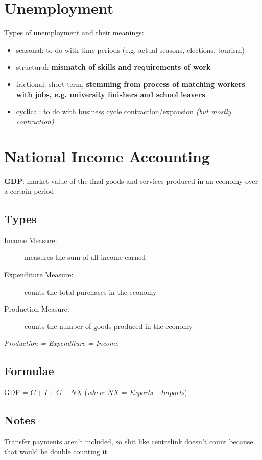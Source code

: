 \documentclass{article}
\begin{document}
\section{Unemployment}
\label{sec:unemp}

Types of unemployment and their meanings:
\begin{itemize}
\item seasonal: to do with time periods (e.g. actual seasons, elections, tourism) 
\item structural: \textbf{mismatch of skills and requirements of work}
\item frictional: short term, \textbf{stemming from process of matching workers with jobs, e.g. university finishers and school leavers} 
\item cyclical: to do with business cycle contraction/expansion \textit{(but mostly contraction)}
\end{itemize}

\section{National Income Accounting}
\label{sec:nati-income-acco}
\textbf{GDP}: market value of the final goods and services produced in an economy over a certain period

\subsection{Types}
\label{sec:types}
\begin{description}
\item [Income Measure:] measures the sum of all income earned
\item [Expenditure Measure:] counts the total purchases in the economy
\item [Production Measure:] counts the number of goods produced in the economy
\end{description}
\textit{Production = Expenditure = Income}

\subsection{Formulae}
\label{sec:formulae}
GDP = $C + I + G + NX$ (\textit{where} $NX$ = \textit{Exports - Imports})

\subsection{Notes}
\label{sec:notes}
Transfer payments aren't included, so shit like centrelink doesn't count because that would be double counting it
\end{document}
